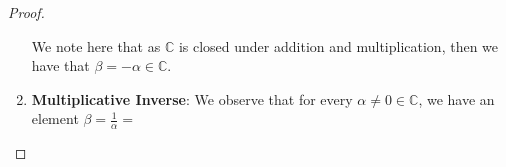 \documentclass[openany]{book}
\newenvironment{innerproof}{\renewcommand{\qedsymbol}{$\square$}\proof}{\endproof}
\renewcommand\qedsymbol{$\blacksquare$}
\newcommand{\CC}{\mathbb{C}}
\begin{document}
\begin{proof}
\begin{enumerate}
\begin{innerproof}
		We note here that as $\CC$ is closed under addition and multiplication, then we have that $\beta = -\alpha \in \CC$.
	\end{innerproof}

	\item \textbf{Multiplicative Inverse}:
	\begin{innerproof}
		We observe that for every $\alpha \not= 0 \in \CC$, we have an element $\beta = \frac{1}{\alpha} = $
	\end{innerproof}
	\end{enumerate}

\end{proof}
\end{document}
